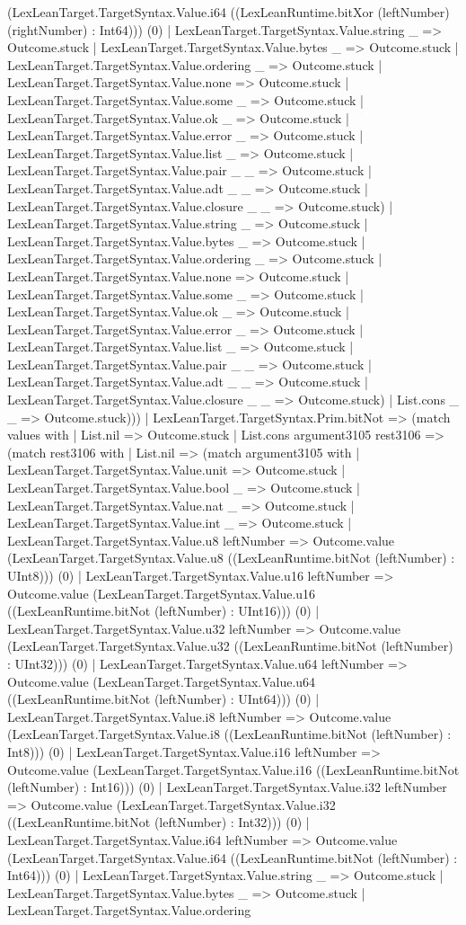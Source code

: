 \documentclass[11pt]{article}
\begin{document}
(LexLeanTarget.TargetSyntax.Value.i64 ((LexLeanRuntime.bitXor (leftNumber) (rightNumber) : Int64))) (0) | LexLeanTarget.TargetSyntax.Value.string \_ => Outcome.stuck | LexLeanTarget.TargetSyntax.Value.bytes \_ => Outcome.stuck | LexLeanTarget.TargetSyntax.Value.ordering \_ => Outcome.stuck | LexLeanTarget.TargetSyntax.Value.none => Outcome.stuck | LexLeanTarget.TargetSyntax.Value.some \_ => Outcome.stuck | LexLeanTarget.TargetSyntax.Value.ok \_ => Outcome.stuck | LexLeanTarget.TargetSyntax.Value.error \_ => Outcome.stuck | LexLeanTarget.TargetSyntax.Value.list \_ => Outcome.stuck | LexLeanTarget.TargetSyntax.Value.pair \_ \_ => Outcome.stuck | LexLeanTarget.TargetSyntax.Value.adt \_ \_ => Outcome.stuck | LexLeanTarget.TargetSyntax.Value.closure \_ \_ => Outcome.stuck) | LexLeanTarget.TargetSyntax.Value.string \_ => Outcome.stuck | LexLeanTarget.TargetSyntax.Value.bytes \_ => Outcome.stuck | LexLeanTarget.TargetSyntax.Value.ordering \_ => Outcome.stuck | LexLeanTarget.TargetSyntax.Value.none => Outcome.stuck | LexLeanTarget.TargetSyntax.Value.some \_ => Outcome.stuck | LexLeanTarget.TargetSyntax.Value.ok \_ => Outcome.stuck | LexLeanTarget.TargetSyntax.Value.error \_ => Outcome.stuck | LexLeanTarget.TargetSyntax.Value.list \_ => Outcome.stuck | LexLeanTarget.TargetSyntax.Value.pair \_ \_ => Outcome.stuck | LexLeanTarget.TargetSyntax.Value.adt \_ \_ => Outcome.stuck | LexLeanTarget.TargetSyntax.Value.closure \_ \_ => Outcome.stuck) | List.cons \_ \_ => Outcome.stuck))) | LexLeanTarget.TargetSyntax.Prim.bitNot => (match values with | List.nil => Outcome.stuck | List.cons argument3105 rest3106 => (match rest3106 with | List.nil => (match argument3105 with | LexLeanTarget.TargetSyntax.Value.unit => Outcome.stuck | LexLeanTarget.TargetSyntax.Value.bool \_ => Outcome.stuck | LexLeanTarget.TargetSyntax.Value.nat \_ => Outcome.stuck | LexLeanTarget.TargetSyntax.Value.int \_ => Outcome.stuck | LexLeanTarget.TargetSyntax.Value.u8 leftNumber => Outcome.value (LexLeanTarget.TargetSyntax.Value.u8 ((LexLeanRuntime.bitNot (leftNumber) : UInt8))) (0) | LexLeanTarget.TargetSyntax.Value.u16 leftNumber => Outcome.value (LexLeanTarget.TargetSyntax.Value.u16 ((LexLeanRuntime.bitNot (leftNumber) : UInt16))) (0) | LexLeanTarget.TargetSyntax.Value.u32 leftNumber => Outcome.value (LexLeanTarget.TargetSyntax.Value.u32 ((LexLeanRuntime.bitNot (leftNumber) : UInt32))) (0) | LexLeanTarget.TargetSyntax.Value.u64 leftNumber => Outcome.value (LexLeanTarget.TargetSyntax.Value.u64 ((LexLeanRuntime.bitNot (leftNumber) : UInt64))) (0) | LexLeanTarget.TargetSyntax.Value.i8 leftNumber => Outcome.value (LexLeanTarget.TargetSyntax.Value.i8 ((LexLeanRuntime.bitNot (leftNumber) : Int8))) (0) | LexLeanTarget.TargetSyntax.Value.i16 leftNumber => Outcome.value (LexLeanTarget.TargetSyntax.Value.i16 ((LexLeanRuntime.bitNot (leftNumber) : Int16))) (0) | LexLeanTarget.TargetSyntax.Value.i32 leftNumber => Outcome.value (LexLeanTarget.TargetSyntax.Value.i32 ((LexLeanRuntime.bitNot (leftNumber) : Int32))) (0) | LexLeanTarget.TargetSyntax.Value.i64 leftNumber => Outcome.value (LexLeanTarget.TargetSyntax.Value.i64 ((LexLeanRuntime.bitNot (leftNumber) : Int64))) (0) | LexLeanTarget.TargetSyntax.Value.string \_ => Outcome.stuck | LexLeanTarget.TargetSyntax.Value.bytes \_ => Outcome.stuck | LexLeanTarget.TargetSyntax.Value.ordering 
\end{document}
